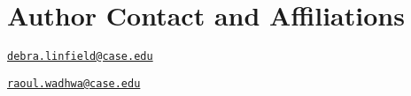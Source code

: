 \pagebreak
\section{Author Contact and Affiliations}

\address{%
Debra T. Linfield\\
Department of Systems Biology and Bioinformatics, Case Western Reserve
University, Cleveland, OH 44106, U.S.A.\\
\\
}
\href{mailto:debra.linfield@case.edu}{\nolinkurl{debra.linfield@case.edu}}

\address{%
Raoul R. Wadhwa\\
Department of Systems Biology and Bioinformatics, Case Western Reserve
University, Cleveland, OH 44016, U.S.A.\\
\\
}
\href{mailto:raoul.wadhwa@case.edu}{\nolinkurl{raoul.wadhwa@case.edu}}

